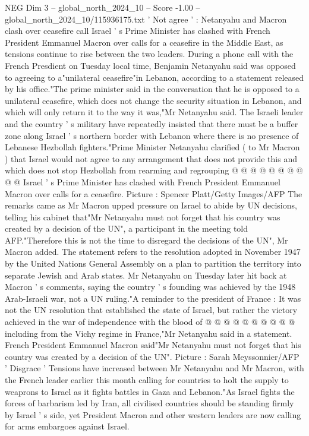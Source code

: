 \begin{textsample}{NEG Dim 3 – global\_north\_2024\_10 – Score -1.00 – global\_north\_2024\_10/115936175.txt}  \label{ex:f3_neg_307}
' Not agree ' : Netanyahu and Macron clash over ceasefire call Israel ' s Prime Minister has clashed with French President Emmanuel Macron over calls for a ceasefire in the Middle East, as tensions continue to rise between the two leaders.
During a phone call with the French Presdient on Tuesday local time, Benjamin Netanyahu said was opposed to agreeing to a"unilateral ceasefire"in Lebanon, according to a statement released by his office."The prime minister said in the conversation that he is opposed to a unilateral ceasefire, which does not change the security situation in Lebanon, and which will only return it to the way it was,"Mr Netanyahu said.
The Israeli leader and the country ' s military have repeatedly insisted that there must be a buffer zone along Israel ' s northern border with Lebanon where there is no presence of Lebanese Hezbollah fighters."Prime Minister Netanyahu clarified ( to Mr Macron ) that Israel would not agree to any arrangement that does not provide this and which does not stop Hezbollah from rearming and regrouping @ @ @ @ @ @ @ @ @ @ Israel ' s Prime Minister has clashed with French President Emmanuel Macron over calls for a ceasefire.
Picture : Spencer Platt/Getty Images/AFP The remarks came as Mr Macron upped pressure on Israel to abide by UN decisions, telling his cabinet that"Mr Netanyahu must not forget that his country was created by a decision of the UN", a participant in the meeting told AFP."Therefore this is not the time to disregard the decisions of the UN", Mr Macron added.
The statement refers to the resolution adopted in November 1947 by the United Nations General Assembly on a plan to partition the territory into separate Jewish and Arab states.
Mr Netanyahu on Tuesday later hit back at Macron ' s comments, saying the country ' s founding was achieved by the 1948 Arab-Israeli war, not a UN ruling."A reminder to the president of France : It was not the UN resolution that established the state of Israel, but rather the victory achieved in the war of independence with the blood of @ @ @ @ @ @ @ @ @ @ including from the Vichy regime in France,"Mr Netanyahu said in a statement.
French President Emmanuel Macron said"Mr Netanyahu must not forget that his country was created by a decision of the UN".
Picture : Sarah Meyssonnier/AFP ' Disgrace ' Tensions have increased between Mr Netanyahu and Mr Macron, with the French leader earlier this month calling for countries to holt the supply to weaprons to Israel as it fights battles in Gaza and Lebanon."As Israel fights the forces of barbarism led by Iran, all civilised countries should be standing firmly by Israel ' s side, yet President Macron and other western leaders are now calling for arms embargoes against Israel.

\end{textsample}
